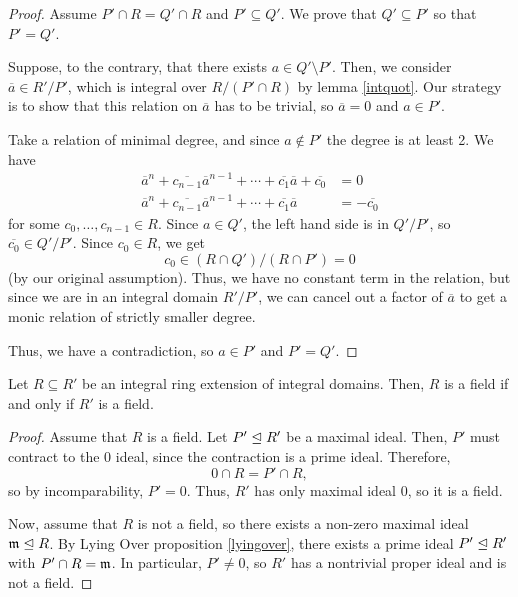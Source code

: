 \documentclass[12pt]{article}
\begin{document}
\begin{proof}
    Assume $P' \cap R = Q' \cap R$ and $P'\subseteq Q'$. We prove that $Q'\subseteq P'$ so that $P'=Q'$.
    
    Suppose, to the contrary, that there exists $a\in Q'\setminus P'$. Then, we consider $\overline{a}\in R'/P'$, which is integral over $R/(P'\cap R)$ by lemma \ref{intquot}. Our strategy is to show that this relation on $\overline{a}$ has to be trivial, so $\overline{a}=0$ and $a\in P'$.
    
    Take a relation of minimal degree, and since $a\not\in P'$ the degree is at least 2. We have
    \begin{align*}
        \overline{a}^n + \overline{c_{n-1}}\overline{a}^{n-1} + \cdots + \overline{c_1} \overline{a} + \overline{c_0} &= 0\\
        \overline{a}^n + \overline{c_{n-1}}\overline{a}^{n-1} + \cdots + \overline{c_1} \overline{a} &= -\overline{c_0}
    \end{align*}
    for some $c_0,\dots,c_{n-1} \in R$. Since $a\in Q'$, the left hand side is in $Q'/P'$, so $\overline{c_0}\in Q'/P'$. Since $c_0\in R$, we get
    \[c_0 \in (R \cap Q')/(R\cap P') = 0\]
    (by our original assumption). Thus, we have no constant term in the relation, but since we are in an integral domain $R'/P'$, we can cancel out a factor of $\overline{a}$ to get a monic relation of strictly smaller degree.
    
    Thus, we have a contradiction, so $a\in P'$ and $P'=Q'$.
\end{proof}

\begin{cor}\label{intfield}
    Let $R\subseteq R'$ be an integral ring extension of integral domains. Then, $R$ is a field if and only if $R'$ is a field.
\end{cor}

\begin{proof}
    Assume that $R$ is a field. Let $P'\trianglelefteq R'$ be a maximal ideal. Then, $P'$ must contract to the $0$ ideal, since the contraction is a prime ideal. Therefore,
    \[0\cap R = P' \cap R,\]
    so by incomparability, $P'=0$. Thus, $R'$ has only maximal ideal $0$, so it is a field.
    
    Now, assume that $R$ is not a field, so there exists a non-zero maximal ideal $\mathfrak{m} \trianglelefteq R$. By Lying Over proposition \ref{lyingover}, there exists a prime ideal $P'\trianglelefteq R'$ with $P'\cap R = \mathfrak{m}$. In particular, $P' \neq 0$, so $R'$ has a nontrivial proper ideal and is not a field.
\end{proof}
\end{document}
